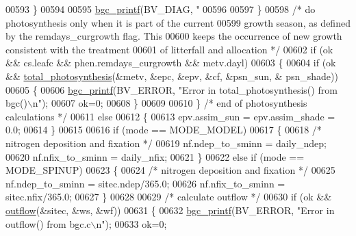 \begin{DoxyCode}
{{{{{{{{{{{{{{{{00593                 \}
00594                 
00595                 \hyperlink{bgc__io_8c_af287cce6e2aede1ce337de9319e80d0d}{bgc\_printf}(BV\_DIAG, \textcolor{stringliteral}{"%
00596 
00597             \}
00598             \textcolor{comment}{/* do photosynthesis only when it is part of the current}
00599 \textcolor{comment}{            growth season, as defined by the remdays\_curgrowth flag.  This}
00600 \textcolor{comment}{            keeps the occurrence of new growth consistent with the treatment}
00601 \textcolor{comment}{            of litterfall and allocation */}
00602             \textcolor{keywordflow}{if} (ok && cs.leafc && phen.remdays\_curgrowth && metv.dayl)
00603             \{
00604                 \textcolor{keywordflow}{if} (ok && \hyperlink{photosynthesis_8c_adba4d3b53331ea3e9e08cd7d0fcec8d4}{total\_photosynthesis}(&metv, &epc, &epv, &cf, &psn\_sun, &
      psn\_shade))
00605                 \{
00606                     \hyperlink{bgc__io_8c_af287cce6e2aede1ce337de9319e80d0d}{bgc\_printf}(BV\_ERROR, \textcolor{stringliteral}{"Error in total\_photosynthesis() from bgc()\(\backslash\)n"});
00607                     ok=0;
00608                 \}
00609                 
00610             \} \textcolor{comment}{/* end of photosynthesis calculations */}
00611             \textcolor{keywordflow}{else}
00612             \{
00613                 epv.assim\_sun = epv.assim\_shade = 0.0;
00614             \}
00615 
00616             \textcolor{keywordflow}{if} (mode == MODE\_MODEL)
00617             \{
00618                 \textcolor{comment}{/* nitrogen deposition and fixation */}
00619                 nf.ndep\_to\_sminn = daily\_ndep;
00620                 nf.nfix\_to\_sminn = daily\_nfix;
00621             \}
00622             \textcolor{keywordflow}{else} \textcolor{keywordflow}{if} (mode == MODE\_SPINUP)
00623             \{
00624                 \textcolor{comment}{/* nitrogen deposition and fixation */}
00625                 nf.ndep\_to\_sminn = sitec.ndep/365.0;
00626                 nf.nfix\_to\_sminn = sitec.nfix/365.0;
00627             \}
00628 
00629             \textcolor{comment}{/* calculate outflow */}
00630             \textcolor{keywordflow}{if} (ok && \hyperlink{outflow_8c_a7114cdaa68100f134ada9732a625c6a9}{outflow}(&sitec, &ws, &wf))
00631             \{
00632                 \hyperlink{bgc__io_8c_af287cce6e2aede1ce337de9319e80d0d}{bgc\_printf}(BV\_ERROR, \textcolor{stringliteral}{"Error in outflow() from bgc.c\(\backslash\)n"});
00633                 ok=0;
}}}}}}}}}}}}}}}}}
\end{DoxyCode}
